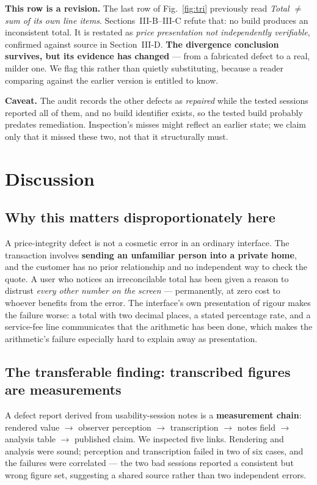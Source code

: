 \documentclass[conference]{IEEEtran}
\begin{document}
\textbf{This row is a revision.} The last row of Fig.~\ref{fig:tri} previously read \emph{Total
$\neq$ sum of its own line items}. Sections~III-B--III-C refute that: no build produces an
inconsistent total. It is restated as \emph{price presentation not independently verifiable},
confirmed against source in Section~III-D. \textbf{The divergence conclusion survives, but its
evidence has changed} --- from a fabricated defect to a real, milder one. We flag this rather than
quietly substituting, because a reader comparing against the earlier version is entitled to know.

\textbf{Caveat.} The audit records the other defects as \emph{repaired} while the tested sessions
reported all of them, and no build identifier exists, so the tested build probably predates
remediation. Inspection's misses might reflect an earlier state; we claim only that it missed these
two, not that it structurally must.

\section{Discussion}

\subsection{Why this matters disproportionately here}

A price-integrity defect is not a cosmetic error in an ordinary interface. The transaction involves
\textbf{sending an unfamiliar person into a private home}, and the customer has no prior relationship and
no independent way to check the quote. A user who notices an irreconcilable total has been given a
reason to distrust \emph{every other number on the screen} --- permanently, at zero cost to whoever
benefits from the error. The interface's own presentation of rigour makes the failure worse: a total
with two decimal places, a stated percentage rate, and a service-fee line communicates that the
arithmetic has been done, which makes the arithmetic's failure especially hard to explain away as
presentation.

\subsection{The transferable finding: transcribed figures are measurements}

A defect report derived from usability-session notes is a \textbf{measurement chain}: rendered value
$\rightarrow$ observer perception $\rightarrow$ transcription $\rightarrow$ notes field $\rightarrow$
analysis table $\rightarrow$ published claim. We inspected five links. Rendering and analysis were
sound; perception and transcription failed in two of six cases, and the failures were correlated --- the
two bad sessions reported a consistent but wrong figure set, suggesting a shared source rather than two
independent errors.
\end{document}
